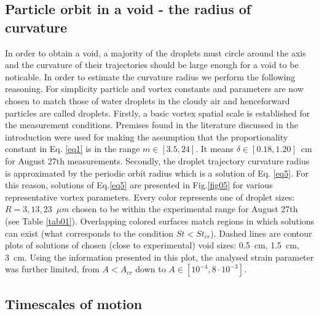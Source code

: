 \documentclass[../main.tex]{subfiles}
\begin{document}
\subsection{Particle orbit in a void - the radius of curvature}
\label{ssec:par}
In order to obtain a void, a majority of the droplets must circle around the axis and the curvature of their trajectories should be large enough for a void to be noticable. In order to estimate the curvature radius we perform the following reasoning. For simplicity particle and vortex constants and parameters are now chosen to match those of water droplets in the cloudy air and henceforward particles are called droplets.
Firstly, a basic vortex spatial scale is established for the measurement conditions. Premises found in the literature discussed in the introduction were used for making the assumption that the proportionality constant in Eq. \ref{eq1} is in the range $m\in[3.5, 24]$. It means $\delta \in [0.18,1.20]$~cm for August 27th measurements.
Secondly, the droplet trajectory curvature radius is approximated by the periodic orbit radius which is a solution of Eq. \ref{eq5}. For this reason, solutions of Eq.\ref{eq5} are presented in Fig.\ref{fig05} for various representative vortex parameters. Every color represents one of droplet sizes: $R=3,13,23$~$\mu m$ chosen to be within the experimental range for August 27th (see Table \ref{tab01}). Overlapping colored surfaces match regions in which solutions can exist (what corresponds to the condition $St<St_{cr}$). Dashed lines are contour plots of solutions of chosen (close to experimental) void sizes: 0.5~cm, 1.5~cm, 3~cm. Using the information presented in this plot, the analysed strain parameter was further limited, from $A<A_{cr}$ down to $A \in [10^{-4}, 8\cdot10^{-3}]$.



\subsection{Timescales of motion}
\end{document}

